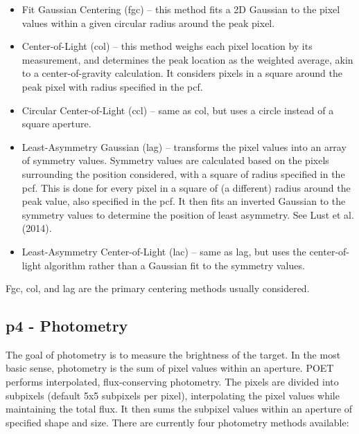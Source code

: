 \documentclass[letterpaper,12pt]{article}
\begin{document}
\begin{itemize}
\item Fit Gaussian Centering (fgc) -- this method fits a 2D Gaussian
  to the pixel values within a given circular radius around the peak pixel.

\item Center-of-Light (col) -- this method weighs each pixel location
  by its measurement, and determines the peak location as the
  weighted average, akin to a center-of-gravity calculation. It considers
  pixels in a square around the peak pixel with radius specified in
  the pcf.

\item Circular Center-of-Light (ccl) -- same as col, but uses a circle
  instead of a square aperture.

\item Least-Asymmetry Gaussian (lag) -- transforms the pixel values
  into an array of symmetry values. Symmetry values are calculated based
  on the pixels surrounding the position considered, with a square of
  radius specified in the pcf. This is done for every pixel in a square
  of (a different) radius around the peak value, also specified in the pcf.
  It then fits an inverted Gaussian to the symmetry values to determine
  the position of least asymmetry. See Lust et al. (2014).

\item Least-Asymmetry Center-of-Light (lac) -- same as lag, but uses
  the center-of-light algorithm rather than a Gaussian fit to the symmetry
  values.

\end{itemize}

Fgc, col, and lag are the primary centering methods usually considered.

\subsection{p4 - Photometry}
\label{sec:p4}
The goal of photometry is to measure the brightness of the target.  In
the most basic sense, photometry is the sum of pixel values within an
aperture. POET performs interpolated, flux-conserving photometry.  The
pixels are divided into subpixels (default 5x5 subpixels per pixel),
interpolating the pixel values while maintaining the total flux. It
then sums the subpixel values within an aperture of specified
shape and size. There are currently four photometry methods available:
\end{document}
